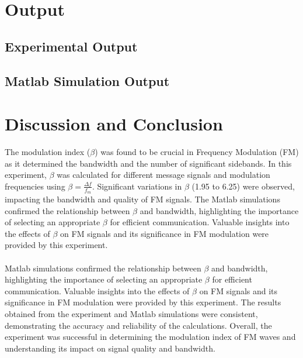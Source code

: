 \documentclass[12pt]{article}
\begin{document}
\inputminted[linenos,breaklines,breakanywhere]{matlab}{./assets/fm.m}

\section*{Output}

\subsection*{Experimental Output}


\subsection*{Matlab Simulation Output}


\section*{Discussion and Conclusion}
The modulation index (\( \beta \)) was found to be crucial in Frequency Modulation (FM) as it determined the bandwidth and the number of significant sidebands. In this experiment, \( \beta \) was calculated for different message signals and modulation frequencies using \( \beta = \frac{\Delta f}{f_m} \). Significant variations in \( \beta \) (1.95 to 6.25) were observed, impacting the bandwidth and quality of FM signals. The Matlab simulations confirmed the relationship between \( \beta \) and bandwidth, highlighting the importance of selecting an appropriate \( \beta \) for efficient communication. Valuable insights into the effects of \( \beta \) on FM signals and its significance in FM modulation were provided by this experiment.
\\\\
Matlab simulations confirmed the relationship between \( \beta \) and bandwidth, highlighting the importance of selecting an appropriate \( \beta \) for efficient communication. Valuable insights into the effects of \( \beta \) on FM signals and its significance in FM modulation were provided by this experiment. The results obtained from the experiment and Matlab simulations were consistent, demonstrating the accuracy and reliability of the calculations. Overall, the experiment was successful in determining the modulation index of FM waves and understanding its impact on signal quality and bandwidth.


\renewcommand{\bibname}{References}

\end{document}
